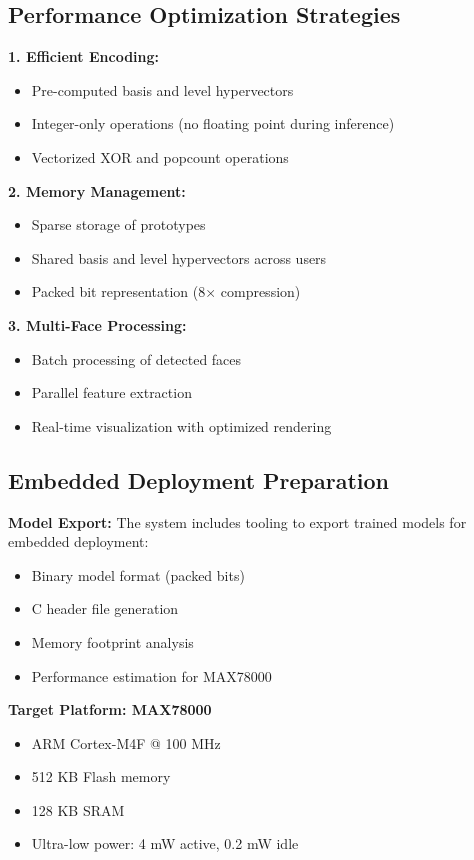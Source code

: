 \documentclass[a4paper,12pt]{article}
\begin{document}
\subsection{Performance Optimization Strategies}

\textbf{1. Efficient Encoding:}
\begin{itemize}
    \item Pre-computed basis and level hypervectors
    \item Integer-only operations (no floating point during inference)
    \item Vectorized XOR and popcount operations
\end{itemize}

\textbf{2. Memory Management:}
\begin{itemize}
    \item Sparse storage of prototypes
    \item Shared basis and level hypervectors across users
    \item Packed bit representation (8× compression)
\end{itemize}

\textbf{3. Multi-Face Processing:}
\begin{itemize}
    \item Batch processing of detected faces
    \item Parallel feature extraction
    \item Real-time visualization with optimized rendering
\end{itemize}

\subsection{Embedded Deployment Preparation}

\textbf{Model Export:}
The system includes tooling to export trained models for embedded deployment:
\begin{itemize}
    \item Binary model format (packed bits)
    \item C header file generation
    \item Memory footprint analysis
    \item Performance estimation for MAX78000
\end{itemize}

\textbf{Target Platform: MAX78000}
\begin{itemize}
    \item ARM Cortex-M4F @ 100 MHz
    \item 512 KB Flash memory
    \item 128 KB SRAM
    \item Ultra-low power: 4 mW active, 0.2 mW idle
\end{itemize}
\end{document}
